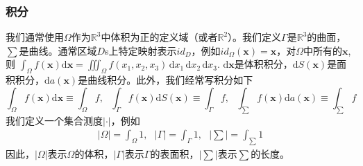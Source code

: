\documentclass[12pt,a4paper]{article}
\numberwithin{equation}{section}
\begin{document}
\subsubsection{积分}
我们通常使用$\Omega$作为$\mathbb{R}^3$中体积为正的定义域（或者$\mathbb{R}^2$）。我们定义$\Gamma$是$\mathbb{R}^3$的曲面，$\sum$是曲线。通常区域$D$s上特定映射表示$id_D$，例如$id_{\Omega}(\mathbf{x})=\mathbf{x}$，对$\Omega$中所有的$\mathbf{x}$,则
$\int _{\Omega} f(\mathbf{x})\mathrm{d}\mathbf{x}=\iiint_{\Omega} f(x_1,x_2,x_3)\,
\mathrm{d}x_1\,\mathrm{d}x_2\,\mathrm{d}x_3.$
$\mathrm{d}\mathbf{x}$是体积积分，$\mathrm{d}S(\mathbf{x})$是面积积分，$\mathrm{d}a(\mathbf{x})$是曲线积分。此外，我们经常写积分如下
$$
\int _{\Omega} f(\mathbf{x})\mathrm{d}\mathbf{x} \equiv \int _{\Omega} f,~~~\int _{\Gamma} f(\mathbf{x})\mathrm{d}S(\mathbf{x}) \equiv \int _{\Gamma} f,~~~\int _{\sum} f(\mathbf{x})\mathrm{d}a(\mathbf{x}) \equiv \int _{\sum} f
$$
我们定义一个集合测度$|\cdot|$，例如
\begin{gather}
|\Omega|=\int _{\Omega}1,~~~|\Gamma|=\int _{\Gamma}1,~~~|\sum|=\int _{\sum}1
\end{gather}
因此，$|\Omega|$表示$\Omega$的体积，$|\Gamma|$表示$\Gamma$的表面积，$|\sum|$表示$\sum$的长度。








\cite{tam19912d}
%
\end{document}
